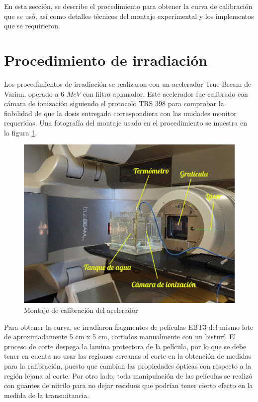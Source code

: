 En esta sección, se describe el procedimiento para obtener la curva de calibración que se usó, así como detalles técnicos del montaje experimental y los implementos que se requirieron. 
\section{Procedimiento de irradiación}
Los procedimientos de irradiación se realizaron con un acelerador True Bream de  Varian, operado a 6 $ MeV$ con filtro aplanador. Este acelerador fue calibrado con cámara de ionización siguiendo el protocolo TRS 398 para comprobar la fiabilidad de que la dosis entregada correspondiera con las unidades monitor requeridas. Una fotografía del montaje usado en el procedimiento se muestra en la figura \ref{fig:fotoMontaje}.\\

\begin{figure}
	\centering
	\includegraphics[width=0.7\linewidth]{images/TRS398Editado2.jpg}
	\caption{Montaje de calibración del acelerador}
	\label{fig:fotoMontaje}
\end{figure}
Para obtener la curva, se irradiaron fragmentos de películas EBT3 del mismo lote de aproximadamente 5 cm x 5 cm, cortados manualmente con un bisturí. El proceso de corte despega la lamina protectora de la película, por lo que se debe tener en cuenta no usar las regiones cercanas al corte en la obtención de medidas para la calibración, puesto que cambian las propiedades ópticas con respecto a la región lejana al corte. Por otro lado, toda manipulación de las películas se realizó con guantes de nitrilo para no dejar residuos que podrían tener cierto efecto en la medida de la transmitancia. \\

